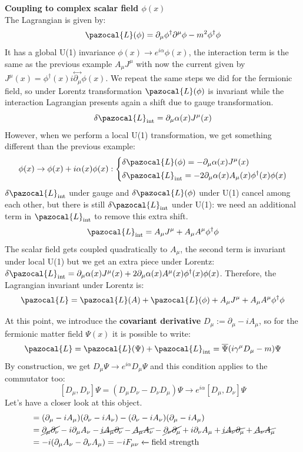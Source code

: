 \documentclass[../main.tex]{subfiles}
\begin{document}
\begin{example}
\textbf{Coupling to complex scalar field $\phi(x)$}\\
The Lagrangian is given by:
\[
\pazocal{L}(\phi)=\partial_\mu\phi^\dagger\partial^\mu\phi-m^2\phi^\dagger\phi
\]
It has a global U(1) invariance $\phi(x)\to e^{i\alpha}\phi(x)$, the interaction term is the same as the previous example $A_\mu J^\mu$ with now the current given by\\
$J^\mu(x)=\phi^\dagger(x)i\overset{\leftrightarrow}{\partial_\mu}\phi(x)$. We repeat the same steps we did for the fermionic field, so under Lorentz transformation $\pazocal{L}(\phi)$ is invariant while the interaction Lagrangian presents again a shift due to gauge transformation.
\[
\delta\pazocal{L}_{\text{int}}=\partial_\mu\alpha(x)J^\mu(x)
\]
However, when we perform a local U(1) transformation, we get something different than the previous example:
\[
\phi(x)\to\phi(x)+i\alpha(x)\phi(x):\left\{
\begin{aligned}
&\delta\pazocal{L}(\phi)=-\partial_\mu\alpha(x)J^\mu(x)\\
&\delta\pazocal{L}_{\text{int}}=-2\partial_\mu\alpha(x)A_\mu(x)\phi^\dagger(x)\phi(x)
\end{aligned}
\right.
\]
$\delta\pazocal{L}_{\text{int}}$ under gauge and $\delta\pazocal{L}(\phi)$ under U(1) cancel among each other, but there is still $\delta\pazocal{L}_{\text{int}}$ under U(1): we need an additional term in $\pazocal{L}_{\text{int}}$ to remove this extra shift.
\[
\pazocal{L}_{\text{int}}=A_\mu J^\mu+A_\mu A^\mu\phi^\dagger\phi
\]
The scalar field gets coupled quadratically to $A_\mu$, the second term is invariant under local U(1) but we get an extra piece under Lorentz: $\delta\pazocal{L}_{\text{int}}=\partial_\mu\alpha(x)J^\mu(x)+2\partial_\mu\alpha(x)A^\mu(x)\phi^\dagger(x)\phi(x)$. Therefore, the Lagrangian invariant under Lorentz is:
\[
\pazocal{L}=\pazocal{L}(A)+\pazocal{L}(\phi)+A_\mu J^\mu+A_\mu A^\mu\phi^\dagger\phi
\]
\end{example}
At this point, we introduce the \textbf{covariant derivative} $D_\mu:=\partial_\mu-iA_\mu$, so for the fermionic matter field $\Psi(x)$ it is possible to write:
\[
\pazocal{L}=\pazocal{L}(\Psi)+\pazocal{L}_{\text{int}}=\overline{\Psi}(i\gamma^\mu D_\mu-m)\Psi
\]
By construction, we get $D_\mu\Psi\to e^{i\alpha}D_\mu\Psi$ and this condition applies to the commutator too:
\[
[D_\mu,D_\nu]\Psi=(D_\mu D_\nu-D_\nu D_\mu)\Psi\to e^{i\alpha}[D_\mu,D_\nu]\Psi
\]
Let's have a closer look at this object.
\begin{align*}
[D_\mu,D_\nu]&=(\partial_\mu-iA_\mu)(\partial_\nu-iA_\nu)-(\partial_\nu-iA_\nu)(\partial_\mu-iA_\mu)\\
&=\cancel{\partial_\mu\partial_\nu}-i\partial_\mu A_\nu-\cancel{iA_\mu\partial_\nu}-\cancel{A_\mu A_\nu}-\cancel{\partial_\nu\partial_\mu}+i\partial_\nu A_\mu+\cancel{iA_\nu\partial_\mu}+\cancel{A_\nu A_\mu}\\
&=-i(\partial_\mu A_\nu-\partial_\nu A_\mu)=-iF_{\mu\nu}\xleftarrow[]{}\text{field strength}
\end{align*}
\end{document}
